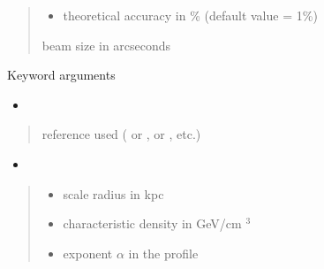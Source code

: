 \documentclass[letterpaper,10pt,english]{sphinxmanual}
\begin{document}
\begin{fulllineitems}
\begin{quote}
\begin{description}
\begin{itemize}
\item {} 
\sphinxAtStartPar
{} \textendash{} theoretical accuracy in \% (default value = 1\%)

\end{itemize}

\sphinxAtStartPar
beam size in arcseconds

\end{description}\end{quote}

\sphinxAtStartPar
Keyword arguments
\begin{itemize}
\item {} 
\sphinxAtStartPar
{}

\end{itemize}
\begin{quote}\begin{description}
\sphinxAtStartPar
{} \textendash{} reference used ( or \sphinxcode{\sphinxupquote{\textquotesingle{}1309.2641\textquotesingle{}}},  or \sphinxcode{\sphinxupquote{\textquotesingle{}1408.0002\textquotesingle{}}}, etc.)

\end{description}\end{quote}
\begin{itemize}
\item {} 
\sphinxAtStartPar
{}

\end{itemize}
\begin{quote}\begin{description}
\begin{itemize}
\item {} 
\sphinxAtStartPar
{} \textendash{} scale radius in kpc

\item {} 
\sphinxAtStartPar
{} \textendash{} characteristic density in GeV/cm \({}^3\)

\item {} 
\sphinxAtStartPar
{} \textendash{} exponent \(\alpha\) in the {\hyperref[\detokenize{diffsph.profiles:diffsph.profiles.templates.hdz}]{}} profile


\end{itemize}
\end{description}
\end{quote}
\end{fulllineitems}
\end{document}
